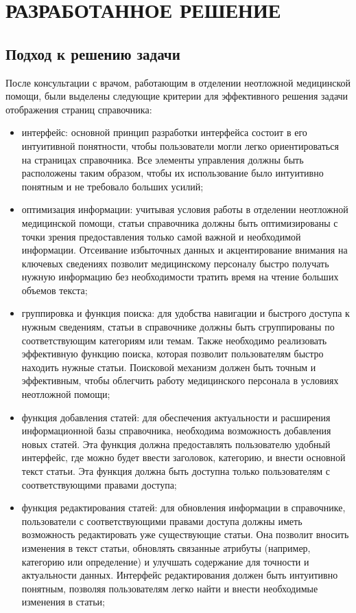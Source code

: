 \section{РАЗРАБОТАННОЕ РЕШЕНИЕ}

\subsection{Подход к решению задачи}

После консультации с врачом, работающим в отделении неотложной медицинской помощи, были выделены следующие критерии для эффективного решения задачи отображения страниц справочника:

\begin{itemize}
    \item интерфейс: основной принцип разработки интерфейса состоит в его интуитивной понятности, чтобы пользователи могли легко ориентироваться на страницах справочника. Все элементы управления должны быть расположены таким образом, чтобы их использование было интуитивно понятным и не требовало больших усилий;
    \item оптимизация информации: учитывая условия работы в отделении неотложной медицинской помощи, статьи справочника должны быть оптимизированы с точки зрения предоставления только самой важной и необходимой информации. Отсеивание избыточных данных и акцентирование внимания на ключевых сведениях позволит медицинскому персоналу быстро получать нужную информацию без необходимости тратить время на чтение больших объемов текста;
    \item группировка и функция поиска: для удобства навигации и быстрого доступа к нужным сведениям, статьи в справочнике должны быть сгруппированы по соответствующим категориям или темам. Также необходимо реализовать эффективную функцию поиска, которая позволит пользователям быстро находить нужные статьи. Поисковой механизм должен быть точным и эффективным, чтобы облегчить работу медицинского персонала в условиях неотложной помощи;
    \item функция добавления статей: для обеспечения актуальности и расширения информационной базы справочника, необходима возможность добавления новых статей. Эта функция должна предоставлять пользователю удобный интерфейс, где можно будет ввести заголовок, категорию, и внести основной текст статьи. Эта функция должна быть доступна только пользователям с соответствующими правами доступа;
    \item функция редактирования статей: для обновления информации в справочнике, пользователи с соответствующими правами доступа должны иметь возможность редактировать уже существующие статьи. Она позволит вносить изменения в текст статьи, обновлять связанные атрибуты (например, категорию или определение) и улучшать содержание для точности и актуальности данных. Интерфейс редактирования должен быть интуитивно понятным, позволяя пользователям легко найти и внести необходимые изменения в статьи;

\end{itemize}
